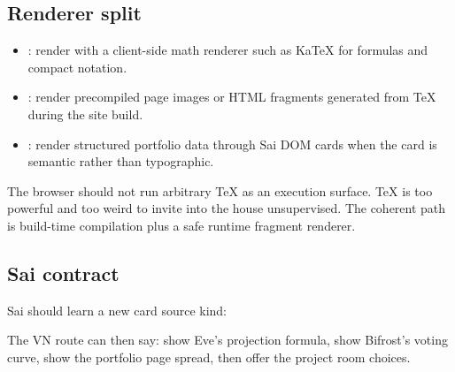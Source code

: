 \subsection{Renderer split}

\begin{itemize}
  \item {}: render with a client-side math renderer such as KaTeX for formulas and compact notation.
  \item {}: render precompiled page images or HTML fragments generated from TeX during the site build.
  \item {}: render structured portfolio data through Sai DOM cards when the card is semantic rather than typographic.
\end{itemize}

The browser should not run arbitrary TeX as an execution surface. TeX is too powerful and too weird to invite into the house unsupervised. The coherent path is build-time compilation plus a safe runtime fragment renderer.

\subsection{Sai contract}

Sai should learn a new card source kind:

\begin{center}
\end{center}

The VN route can then say: show Eve's projection formula, show Bifrost's voting curve, show the portfolio page spread, then offer the project room choices.

